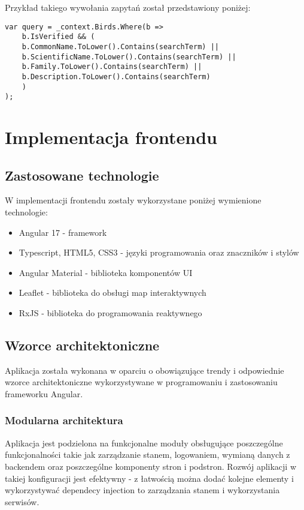 Przykład takiego wywołania zapytań został przedstawiony poniżej:
\begin{lstlisting}[style=csharp, caption={Przykład wywołania zapytania bazodanowego za pomocą EF Core oraz LINQ}]
var query = _context.Birds.Where(b =>
	b.IsVerified && (
	b.CommonName.ToLower().Contains(searchTerm) ||
	b.ScientificName.ToLower().Contains(searchTerm) ||
	b.Family.ToLower().Contains(searchTerm) ||
	b.Description.ToLower().Contains(searchTerm)
	)
);
\end{lstlisting}

\section{Implementacja frontendu}

\subsection{Zastosowane technologie}
W implementacji frontendu zostały wykorzystane poniżej wymienione technologie:
\begin{itemize}
	\item Angular 17 - framework
	\item Typescript, HTML5, CSS3 - języki programowania oraz znaczników i stylów
	\item Angular Material - biblioteka komponentów UI
	\item Leaflet - biblioteka do obsługi map interaktywnych
	\item RxJS - biblioteka do programowania reaktywnego
\end{itemize}

\subsection{Wzorce architektoniczne}
Aplikacja została wykonana w oparciu o obowiązujące trendy i odpowiednie wzorce architektoniczne wykorzystywane w programowaniu i zastosowaniu frameworku Angular.

\subsubsection{Modularna architektura}
Aplikacja jest podzielona na funkcjonalne moduły obsługujące poszczególne funkcjonalności takie jak zarządzanie stanem, logowaniem, wymianą danych z backendem oraz poszczególne komponenty stron i podstron.
Rozwój aplikacji w takiej konfiguracji jest efektywny - z łatwością można dodać kolejne elementy i wykorzystywać dependecy injection to zarządzania stanem i wykorzystania serwisów.

